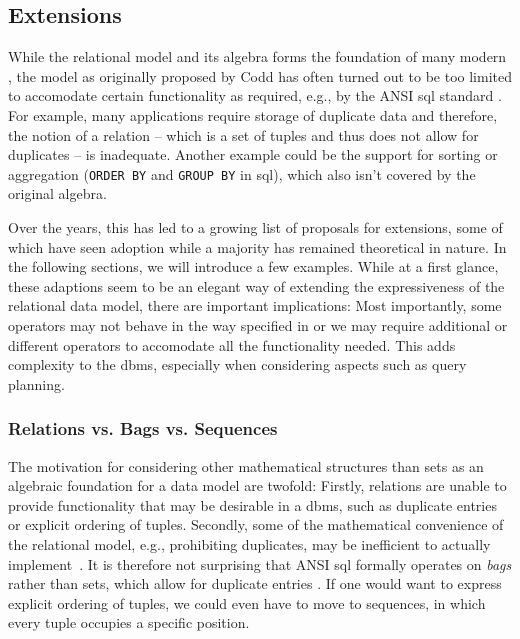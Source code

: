 \subsection{Extensions}
\label{section:rel_extensions}

While the relational model and its algebra forms the foundation of many modern , the model as originally proposed by Codd has often turned out to be too limited to accomodate certain functionality as required, e.g., by the ANSI \acrshort{sql} standard \cite{Libkin:2003Expressive,XOpen:1996SQL}. For example, many applications require storage of duplicate data and therefore, the notion of a relation -- which is a set of tuples and thus does not allow for duplicates -- is inadequate. Another example could be the support for sorting or aggregation (\texttt{ORDER BY} and \texttt{GROUP BY} in \acrshort{sql}), which also isn't covered by the original algebra.

Over the years, this has led to a growing list of proposals for extensions, some of which have seen adoption while a majority has remained theoretical in nature. In the following sections, we will introduce a few examples. While at a first glance, these adaptions seem to be an elegant way of extending the expressiveness of the relational data model, there are important implications: Most importantly, some operators may not behave in the way specified in  or we may require additional or different operators to accomodate all the functionality needed. This adds complexity to the \acrshort{dbms}, especially when considering aspects such as query planning.

\subsubsection{Relations vs. Bags vs. Sequences}

The motivation for considering other mathematical structures than sets as an algebraic foundation for a data model are twofold: Firstly, relations are unable to provide functionality that may be desirable in a \acrshort{dbms}, such as duplicate entries or explicit ordering of tuples. Secondly, some of the mathematical convenience of the relational model, e.g., prohibiting duplicates, may be inefficient to actually implement~\cite{Garcia:2009Database}. It is therefore not surprising that ANSI \acrshort{sql}  \cite{XOpen:1996SQL} formally operates on \emph{bags} rather than sets, which allow for duplicate entries \cite{Garcia:2009Database,Chamberlin:2012Early}. If one would want to express explicit ordering of tuples, we could even have to move to sequences, in which every tuple occupies a specific position.

